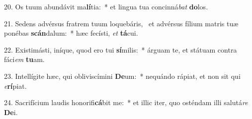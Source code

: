 20. Os tuum abundávit ma\textbf{lí}tia:~*  et lingua tua concinná\textit{bat} \textbf{do}los.\

21. Sedens advérsus fratrem tuum loquebáris, \dag\  et advérsus fílium matris tuæ ponébas \textbf{scán}dalum:~*  hæc fecísti, \textit{et} \textbf{tá}cui.\

22. Existimásti, iníque, quod ero tui \textbf{sí}milis:~*  árguam te, et státuam contra fáci\textit{em} \textbf{tu}am.\

23. Intellígite hæc, qui obliviscímini \textbf{De}um:~*  nequándo rápiat, et non sit qui \textit{e}\textbf{rí}piat.\

24. Sacrifícium laudis honorifi\textbf{cá}bit me:~*  et illic iter, quo osténdam illi salutá\textit{re} \textbf{De}i.\

